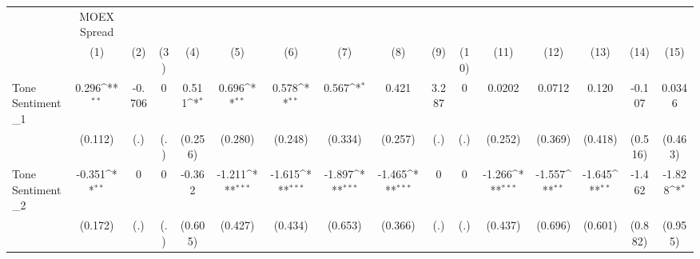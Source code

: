 {
\def\sym#1{\ifmmode^{#1}\else\(^{#1}\)\fi}
\begin{tabular}{l*{15}{c}}
\hline\hline
            & MOEX Spread         &                     &                     &                     &                     &                     &                     &                     &                     &                     &                     &                     &                     &                     &                     \\
            &\multicolumn{1}{c}{(1)}         &\multicolumn{1}{c}{(2)}         &\multicolumn{1}{c}{(3)}         &\multicolumn{1}{c}{(4)}         &\multicolumn{1}{c}{(5)}         &\multicolumn{1}{c}{(6)}         &\multicolumn{1}{c}{(7)}         &\multicolumn{1}{c}{(8)}         &\multicolumn{1}{c}{(9)}         &\multicolumn{1}{c}{(10)}         &\multicolumn{1}{c}{(11)}         &\multicolumn{1}{c}{(12)}         &\multicolumn{1}{c}{(13)}         &\multicolumn{1}{c}{(14)}         &\multicolumn{1}{c}{(15)}         \\
\hline
Tone Sentiment\_{1}&       0.296\sym{**} &      -0.706         &           0         &       0.511\sym{*}  &       0.696\sym{**} &       0.578\sym{**} &       0.567\sym{*}  &       0.421         &       3.287         &           0         &      0.0202         &      0.0712         &       0.120         &      -0.107         &      0.0346         \\
            &     (0.112)         &         (.)         &         (.)         &     (0.256)         &     (0.280)         &     (0.248)         &     (0.334)         &     (0.257)         &         (.)         &         (.)         &     (0.252)         &     (0.369)         &     (0.418)         &     (0.516)         &     (0.463)         \\
[1em]
Tone Sentiment\_{2}&      -0.351\sym{**} &           0         &           0         &      -0.362         &      -1.211\sym{***}&      -1.615\sym{***}&      -1.897\sym{***}&      -1.465\sym{***}&           0         &           0         &      -1.266\sym{***}&      -1.557\sym{**} &      -1.645\sym{**} &      -1.462         &      -1.828\sym{*}  \\
            &     (0.172)         &         (.)         &         (.)         &     (0.605)         &     (0.427)         &     (0.434)         &     (0.653)         &     (0.366)         &         (.)         &         (.)         &     (0.437)         &     (0.696)         &     (0.601)         &     (0.882)         &     (0.955)         \\

\end{tabular}}
